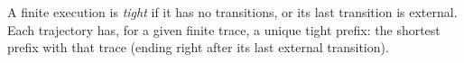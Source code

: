 \begin{definition}
  \label{def:istight}
  \leanok
  A finite execution is \emph{tight} if it has no transitions, or its last transition is external.
  Each trajectory has, for a given finite trace, a unique tight prefix: the shortest prefix with that trace (ending right after its last external transition).
\end{definition}
